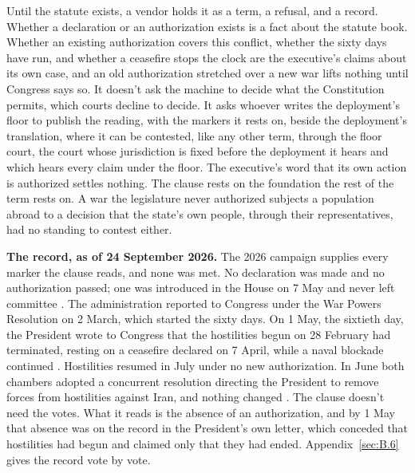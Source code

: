 Until the statute exists, a vendor holds it as a term, a refusal, and a record. Whether a declaration or an authorization exists is a fact about the statute book. Whether an existing authorization covers this conflict, whether the sixty days have run, and whether a ceasefire stops the clock are the executive's claims about its own case, and an old authorization stretched over a new war lifts nothing until Congress says so. It doesn't ask the machine to decide what the Constitution permits, which courts decline to decide. It asks whoever writes the deployment's floor to publish the reading, with the markers it rests on, beside the deployment's translation, where it can be contested, like any other term, through the floor court, the court whose jurisdiction is fixed before the deployment it hears and which hears every claim under the floor. The executive's word that its own action is authorized settles nothing. The clause rests on the foundation the rest of the term rests on. A war the legislature never authorized subjects a population abroad to a decision that the state's own people, through their representatives, had no standing to contest either.

\begin{esbox}
\textbf{The record, as of 24 September 2026.} The 2026 campaign supplies every marker the clause reads, and none was met. No declaration was made and no authorization passed; one was introduced in the House on 7 May and never left committee \autocite{hjres176}. The administration reported to Congress under the War Powers Resolution on 2 March, which started the sixty days. On 1 May, the sixtieth day, the President wrote to Congress that the hostilities begun on 28 February had terminated, resting on a ceasefire declared on 7 April, while a naval blockade continued \autocite{cbs2026terminated,lawfare2026sixtydays}. Hostilities resumed in July under no new authorization. In June both chambers adopted a concurrent resolution directing the President to remove forces from hostilities against Iran, and nothing changed \autocite{hconres86,asil2026iranwpr}. The clause doesn't need the votes. What it reads is the absence of an authorization, and by 1 May that absence was on the record in the President's own letter, which conceded that hostilities had begun and claimed only that they had ended. Appendix~\ref{sec:B.6} gives the record vote by vote.
\end{esbox}
